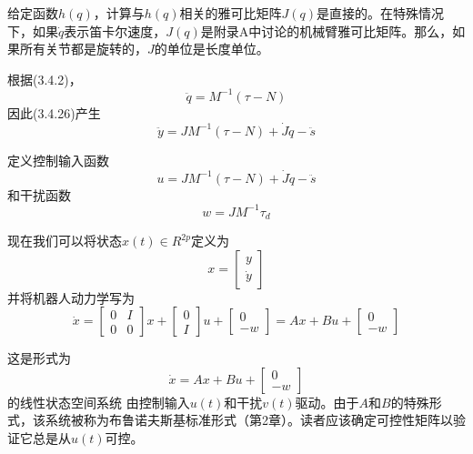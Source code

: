 \documentclass[12pt,a4paper]{ctexart}
\begin{document}
给定函数$h(q)$，计算与$h(q)$相关的雅可比矩阵$J(q)$是直接的。在特殊情况下，如果$\dot{q}$表示笛卡尔速度，$J(q)$是附录A中讨论的机械臂雅可比矩阵。那么，如果所有关节都是旋转的，$J$的单位是长度单位。

根据(3.4.2)，
\begin{equation}
\ddot{q} = M^{-1}(\tau - N)
\end{equation}
因此(3.4.26)产生
\begin{equation}
\ddot{y} = JM^{-1}(\tau - N) + \dot{J}\dot{q} - \ddot{s}
\end{equation}

定义控制输入函数
\begin{equation}
u = JM^{-1}(\tau - N) + \dot{J}\dot{q} - \ddot{s}
\end{equation}
和干扰函数
\begin{equation}
w = JM^{-1}\tau_d
\end{equation}

现在我们可以将状态$x(t) \in R^{2p}$定义为
\begin{equation}
x = \begin{bmatrix} y \\ \dot{y} \end{bmatrix}
\end{equation}
并将机器人动力学写为
\begin{equation}
\dot{x} = \begin{bmatrix} 0 & I \\ 0 & 0 \end{bmatrix}x + \begin{bmatrix} 0 \\ I \end{bmatrix}u + \begin{bmatrix} 0 \\ -w \end{bmatrix} = Ax + Bu + \begin{bmatrix} 0 \\ -w \end{bmatrix}
\end{equation}

这是形式为
\begin{equation}
\dot{x} = Ax + Bu + \begin{bmatrix} 0 \\ -w \end{bmatrix}
\end{equation}
的线性状态空间系统
由控制输入$u(t)$和干扰$v(t)$驱动。由于$A$和$B$的特殊形式，该系统被称为布鲁诺夫斯基标准形式（第2章）。读者应该确定可控性矩阵以验证它总是从$u(t)$可控。
\end{document}
